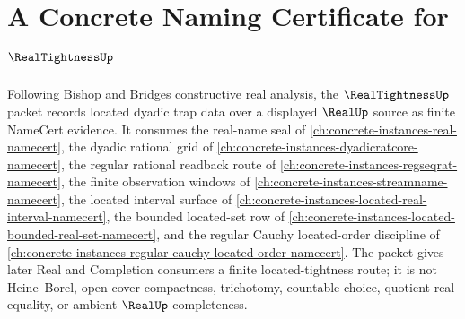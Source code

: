 \chapter{A Concrete Naming Certificate for $\RealTightnessUp$}
\label{ch:concrete-instances-real-tightness-namecert}

Following Bishop and Bridges constructive real analysis, the $\RealTightnessUp$ packet records located dyadic trap data over a displayed $\RealUp$ source as finite NameCert evidence. It consumes the real-name seal of \autoref{ch:concrete-instances-real-namecert}, the dyadic rational grid of \autoref{ch:concrete-instances-dyadicratcore-namecert}, the regular rational readback route of \autoref{ch:concrete-instances-regseqrat-namecert}, the finite observation windows of \autoref{ch:concrete-instances-streamname-namecert}, the located interval surface of \autoref{ch:concrete-instances-located-real-interval-namecert}, the bounded located-set row of \autoref{ch:concrete-instances-located-bounded-real-set-namecert}, and the regular Cauchy located-order discipline of \autoref{ch:concrete-instances-regular-cauchy-located-order-namecert}. The packet gives later Real and Completion consumers a finite located-tightness route; it is not Heine--Borel, open-cover compactness, trichotomy, countable choice, quotient real equality, or ambient $\RealUp$ completeness.

